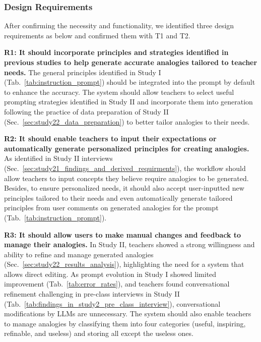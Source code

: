 \subsubsection{Design Requirements}
After confirming the necessity and functionality, we identified three design requirements as below and confirmed them with T1 and T2.

\textbf{R1: It should incorporate principles and strategies identified in previous studies to help generate accurate analogies tailored to teacher needs.}
The general principles identified in Study I (Tab.~\ref{tab:instruction_prompt}) should be integrated into the prompt by default to enhance the accuracy.
The system should allow teachers to select useful prompting strategies identified in Study II and incorporate them into generation following the practice of data preparation of Study II (Sec.~\ref{sec:study22_data_preparation}) to better tailor analogies to their needs.

\textbf{R2: It should enable teachers to input their expectations or automatically generate personalized principles for creating analogies.}
As identified in Study II interviews (Sec.~\ref{sec:study21_findings_and_derived_requirments}), the workflow should allow teachers to input concepts they believe require analogies to be generated.
Besides, to ensure personalized needs, it should also accept user-inputted new principles tailored to their needs and even automatically generate tailored principles from user comments on generated analogies for the prompt (Tab.~\ref{tab:instruction_prompt}).

\textbf{R3: It should allow users to make manual changes and feedback to manage their analogies.}
In Study II, teachers showed a strong willingness and ability to refine and manage generated analogies (Sec.~\ref{sec:study22_results_analysis}), highlighting the need for a system that allows direct editing.
As prompt evolution in Study I showed limited improvement (Tab.~\ref{tab:error_rates}), and teachers found conversational refinement challenging in pre-class interviews in Study II (Tab.~\ref{tab:findings_in_study2_pre_class_interview}), conversational modifications by LLMs are unnecessary.
The system should also enable teachers to manage analogies by classifying them into four categories (useful, inspiring, refinable, and useless) and storing all except the useless ones.




